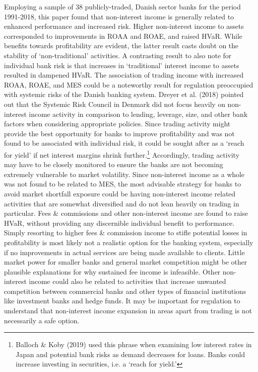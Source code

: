 \documentclass[10pt]{article} %
\begin{document}
Employing a sample of 38 publicly-traded, Danish sector banks for the period 1991-2018, this paper found that non-interest income is generally related to enhanced performance and increased risk. Higher non-interest income to assets corresponded to improvements in ROAA and ROAE, and raised HVaR. While benefits towards profitability are evident, the latter result casts doubt on the stability of `non-traditional' activities. A contrasting result to also note for individual bank risk is that increases in `traditional' interest income to assets resulted in dampened HVaR. The association of trading income with increased ROAA, ROAE, and MES could be a noteworthy result for regulation preoccupied with systemic risks of the Danish banking system. Dreyer et al. (2018) pointed out that the Systemic Risk Council in Denmark did not focus heavily on non-interest income activity in comparison to lending, leverage, size, and other bank factors when considering appropriate policies. Since trading activity might provide the best opportunity for banks to improve profitability and was not found to be associated with individual risk, it could be sought after as a `reach for yield' if net interest margins shrink further.\footnote{Balloch \& Koby (2019) used this phrase when examining low interest rates in Japan and potential bank risks as demand decreases for loans. Banks could increase investing in securities, i.e. a `reach for yield.' } Accordingly, trading activity may have to be closely monitored to ensure the banks are not becoming extremely vulnerable to market volatility. Since non-interest income as a whole was not found to be related to MES, the most advisable strategy for banks to avoid market shortfall exposure could be having non-interest income related activities that are somewhat diversified and do not lean heavily on trading in particular. Fees \& commissions and other non-interest income are found to raise HVaR, without providing any discernible individual benefit to performance. Simply resorting to higher fees \& commission income to stifle potential losses in profitability is most likely not a realistic option for the banking system, especially if no improvements in actual services are being made available to clients. Little market power for smaller banks and general market competition might be other plausible explanations for why sustained fee income is infeasible. Other non-interest income could also be related to activities that increase unwanted competition between commercial banks and other types of financial institutions like investment banks and hedge funds. It may be important for regulation to understand that non-interest income expansion in areas apart from trading is not necessarily a safe option. 
\end{document}
